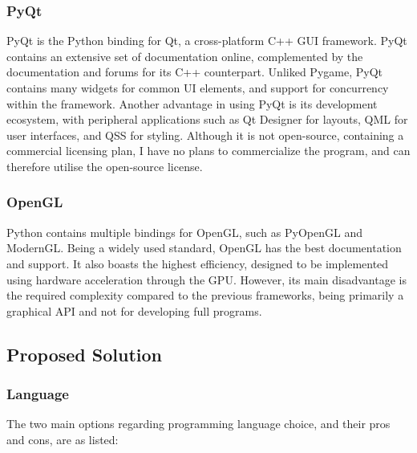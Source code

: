 \documentclass[../main/main.tex]{subfiles}
\begin{document}
\subsubsection*{PyQt}
PyQt is the Python binding for Qt, a cross-platform C++ GUI framework. PyQt contains an extensive set of documentation online, complemented by the documentation and forums for its C++ counterpart. Unliked Pygame, PyQt contains many widgets for common UI elements, and support for concurrency within the framework. Another advantage in using PyQt is its development ecosystem, with peripheral applications such as Qt Designer for layouts, QML for user interfaces, and QSS for styling. Although it is not open-source, containing a commercial licensing plan, I have no plans to commercialize the program, and can therefore utilise the open-source license. 

\subsubsection*{OpenGL}
Python contains multiple bindings for OpenGL, such as PyOpenGL and ModernGL. Being a widely used standard, OpenGL has the best documentation and support. It also boasts the highest efficiency, designed to be implemented using hardware acceleration through the GPU. However, its main disadvantage is the required complexity compared to the previous frameworks, being primarily a graphical API and not for developing full programs.

\subsection{Proposed Solution}
\subsubsection{Language}
The two main options regarding programming language choice, and their pros and cons, are as listed:
\end{document}
